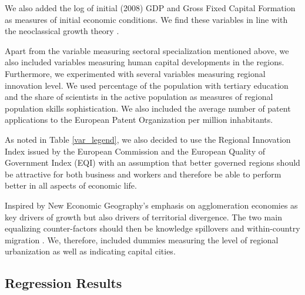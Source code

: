 \documentclass[11pt]{article}
\begin{document}
We also added the log of initial (2008) GDP and Gross Fixed Capital Formation as measures of initial economic conditions. We find these variables in line with the neoclassical growth theory \cite{iammarino2017regional}.%

Apart from the variable measuring sectoral specialization mentioned above, we also included variables measuring human capital developments in the regions. Furthermore, we experimented with several variables measuring regional innovation level. We used percentage of the population with tertiary education and the share of scientists in the active population as measures of regional population skills sophistication. We also included the average number of patent applications to the European Patent Organization per million inhabitants. 

As noted in Table \ref{var_legend}, we also decided to use the Regional Innovation Index issued by the European Commission and the European Quality of Government Index (EQI) with an assumption that better governed regions should be attractive for both business and workers and therefore be able to perform better in all aspects of economic life.

Inspired by New Economic Geography's emphasis on agglomeration economies as key drivers of growth but also drivers of territorial divergence. The two main equalizing counter-factors should then be knowledge spillovers and within-country migration  \citep{iammarino2017regional}. We, therefore, included dummies measuring the level of regional urbanization as well as indicating capital cities. %

\subsection{Regression Results}
\end{document}
